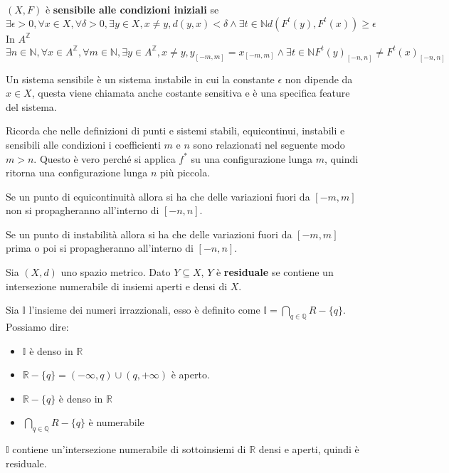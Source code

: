 \begin{definizione} 
    $(X,F)$ è \textbf{sensibile alle condizioni iniziali} se
    $$\exists \epsilon > 0,\forall x \in X, \forall \delta > 0, \exists y\in X,x \ne y, d(y,x) < \delta \land \exists t\in \mathbb{N} d(F^t(y),F^t(x))\ge \epsilon$$
    In $A^\mathbb{Z}$
    $$\exists n\in \mathbb{N} ,\forall x \in A^\mathbb{Z}, \forall m\in \mathbb{N} , \exists y\in A^\mathbb{Z},x \ne y, y_{[-m,m]} = x_{[-m,m]} \land \exists t\in \mathbb{N} F^t(y)_{[-n,n]}\ne F^t(x)_{[-n,n]}$$
\end{definizione}
\begin{nota}
    Un sistema sensibile è un sistema instabile in cui la constante $\epsilon$
    non dipende da $x\in X$, questa viene chiamata anche costante sensitiva e
    è una specifica feature del sistema.
\end{nota}
\begin{nota}
    Ricorda che nelle definizioni di punti e sistemi stabili, equicontinui, instabili e sensibili
    alle condizioni i coefficienti $m$ e $n$ sono relazionati nel seguente modo $m> n$.
    Questo è vero perché si applica $f^\ast$ su una configurazione lunga $m$, quindi
    ritorna una configurazione lunga $n$ più piccola.
\end{nota}

Se un punto di equicontinuità allora si ha che delle variazioni fuori da $[-m,m]$
non si propagheranno all'interno di $[-n,n]$.

Se un punto di instabilità allora si ha che delle variazioni fuori da $[-m,m]$
prima o poi si propagheranno all'interno di $[-n,n]$.

\begin{definizione}
    Sia $(X,d)$ uno spazio metrico. Dato $Y\subseteq X$, $Y$ è \textbf{residuale}
    se contiene un intersezione numerabile di insiemi aperti e densi di $X$.
\end{definizione}
\begin{esempio}
    Sia $\mathbb{I}$ l'insieme dei numeri irrazzionali, esso è definito come
    $\mathbb{I} =\bigcap_{q\in \mathbb{Q}} R-\{q\}$.
    Possiamo dire:
    \begin{itemize}
        \item $\mathbb{I}$ è denso in $\mathbb{R}$
        \item $\mathbb{R} - \{q\} = \left(-\infty, q\right)\cup \left(q,+\infty\right)$ è aperto.
        \item $\mathbb{R} - \{q\}$ è denso in $\mathbb{R}$
        \item $\bigcap_{q\in \mathbb{Q}} R-\{q\}$ è numerabile
    \end{itemize}
    $\mathbb{I}$ contiene un'intersezione numerabile di sottoinsiemi di $\mathbb{R}$ densi e aperti, quindi è residuale.
\end{esempio}


